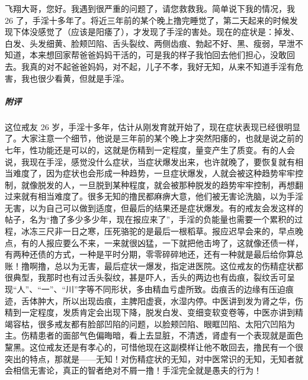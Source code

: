 \begin{case}
    飞翔大哥，您好。我遇到很严重的问题了，请您救救我。简单说下我的情况，我 26 了，手淫十多年了。将近三年前的某个晚上撸完睡觉了，第二天起来的时候发现下体没感觉了（应该是阳痿了），才发现了手淫的害处。现在的症状是：掉发、白发、头发细黄、脸颊凹陷、舌头裂纹、两侧齿痕、勃起不好、黑、瘦弱，早泄不知道，本来想回家帮爸爸妈妈干活的，可是我的样子我怕回去他们担心，没敢回去。我真的对不起爸爸妈妈，对不起，儿子不孝，我好无知，从来不知道手淫有危害，我也很少看黄，但就是手淫。
    \subparagraph{附评} 这位戒友 26 岁，手淫十多年，估计从刚发育就开始了，现在症状表现已经很明显了。大家注意一个细节，他说是三年前的某个晚上才突然阳痿的，也就是说之前的七年，性功能还是可以的，这就是伤精到一定程度，量变产生了质变。有的人会说，我现在手淫，感觉没什么症状，当症状爆发出来，也许就晚了，要恢复就有相当难度了，因为症状也会形成一种趋势，一旦症状爆发，人就会被这种趋势牢牢控制，就像脱发的人，一旦脱到某种程度，就会被那种脱发的趋势牢牢控制，再想翻过来就有相当难度了。很多无知的撸民都麻痹大意，他们被无害论洗脑，以为手淫无害，以为自己可以做到适度，但最后的结果还是症状爆发。有的戒友会发这样的帖子，名为“撸了多少多少年，现在报应来了”，手淫的负能量也需要一个累积的过程，冰冻三尺非一日之寒，压死骆驼的是最后一根稻草。报应迟早会来的，早点晚点，有的人报应要么不来，一来就很凶猛，一下就把他击垮了，这就像还债一样，有两种还债的方式，一种是平时分期，零零碎碎地还，还有一种就是最后给你算总账！撸啊撸，总以为无害，最后症状一爆发，指定进医院。这位戒友的伤精症状都很典型，我那时也有过舌头裂纹，甚是吓人，舌头的两边也有齿痕，裂纹舌可呈现“人”、“一”、“川”字等不同形状，多由精血亏虚所致。齿痕舌的边缘有压迫痕迹，舌体肿大，所以出现齿痕，主脾阳虚衰，水湿内停。中医讲到发为肾之华，伤精到一定程度，发质肯定会出现下降，脱发白发、变细变软变卷等，中医亦讲到精竭容枯，很多戒友都有脸部凹陷的问题，以脸颊凹陷、眼眶凹陷、太阳穴凹陷为主。伤精患者的面部气色偏晦暗，看上去显脏，不清透，肾虚有一个表现就是面色黧黑。这位戒友还是有孝心的，可惜他现在这副模样让他不敢回去，撸民有一个很突出的特点，那就是——无知！对伤精症状的无知，对中医常识的无知，无知者就会相信无害论，真正的智者绝对不屑一撸！手淫完全就是愚夫的行为！
\end{case}

